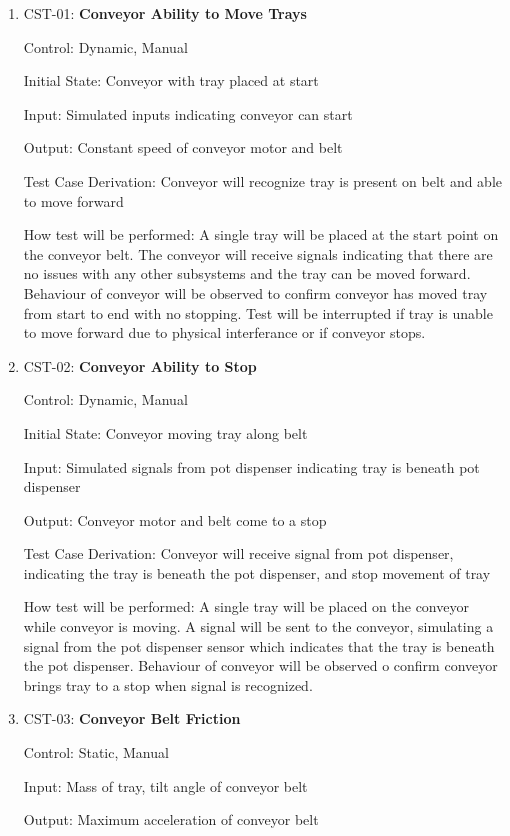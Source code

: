 \documentclass[12pt, titlepage]{article}
\begin{document}
\begin{enumerate}
\item{CST-01: \textbf{Conveyor Ability to Move Trays}}

Control: Dynamic, Manual

Initial State: Conveyor with tray placed at start

Input: Simulated inputs indicating conveyor can start

Output: Constant speed of conveyor motor and belt

Test Case Derivation: Conveyor will recognize tray is present on belt and able to move forward

How test will be performed: A single tray will be placed at the start point on the conveyor belt. The conveyor 
will receive signals indicating that there are no issues with any other subsystems and the tray can be moved 
forward. Behaviour of conveyor will be observed to confirm conveyor has moved tray from start to end with no 
stopping. Test will be interrupted if tray is unable to move forward due to physical interferance or if conveyor stops.
\\
\item{CST-02: \textbf{Conveyor Ability to Stop}}

Control: Dynamic, Manual

Initial State: Conveyor moving tray along belt

Input: Simulated signals from pot dispenser indicating tray is beneath pot dispenser

Output: Conveyor motor and belt come to a stop

Test Case Derivation: Conveyor will receive signal from pot dispenser, indicating the tray is beneath the pot
dispenser, and stop movement of tray

How test will be performed: A single tray will be placed on the conveyor while conveyor is moving. A signal will be 
sent to the conveyor, simulating a signal from the pot dispenser sensor which indicates that the tray is beneath 
the pot dispenser. Behaviour of conveyor will be observed o confirm conveyor brings tray to a stop when signal is 
recognized.\\

\item{CST-03: \textbf{Conveyor Belt Friction}}

Control: Static, Manual

Input: Mass of tray, tilt angle of conveyor belt

Output: Maximum acceleration of conveyor belt


\end{enumerate}
\end{document}
